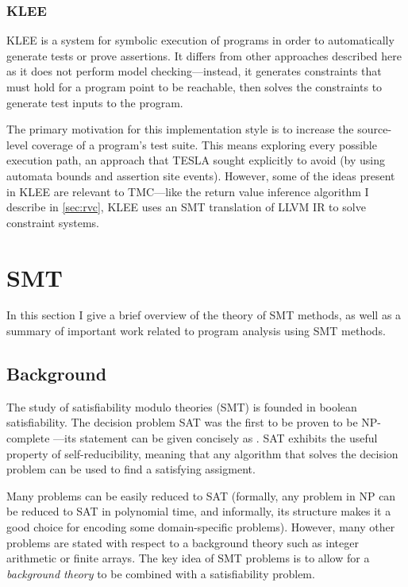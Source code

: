 \subsubsection{KLEE}

KLEE \cite{cadar_klee:_2008} is a system for symbolic execution of programs in
order to automatically generate tests or prove assertions. It differs from other
approaches described here as it does not perform model checking---instead, it
generates constraints that must hold for a program point to be reachable, then
solves the constraints to generate test inputs to the program.

The primary motivation for this implementation style is to increase the
source-level coverage of a program's test suite. This means exploring every
possible execution path, an approach that TESLA sought explicitly to avoid (by
using automata bounds and assertion site events). However, some of the ideas
present in KLEE are relevant to TMC---like the return value inference algorithm
I describe in \autoref{sec:rvc}, KLEE uses an SMT translation of LLVM IR to
solve constraint systems.

\section{SMT} \label{sec:smt}

In this section I give a brief overview of the theory of SMT methods, as well as
a summary of important work related to program analysis using SMT methods.

\subsection{Background}

The study of satisfiability modulo theories (SMT) is founded in boolean
satisfiability. The decision problem SAT was the first to be proven to
be NP-complete \cite{cook_complexity_1971}---its statement can be given
concisely as . SAT exhibits the useful property of self-reducibility,
meaning that any algorithm that solves the decision problem can be used
to find a satisfying assigment.

Many problems can be easily reduced to SAT (formally, any problem in NP can be
reduced to SAT in polynomial time, and informally, its structure makes it a good
choice for encoding some domain-specific problems). However, many other problems
are stated with respect to a background theory such as integer arithmetic or
finite arrays. The key idea of SMT problems is to allow for a \emph{background
theory} to be combined with a satisfiability problem.

